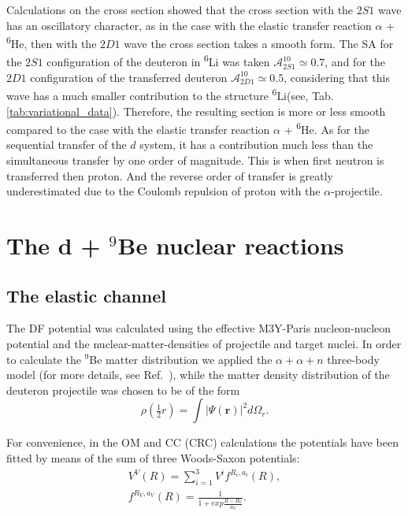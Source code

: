 \documentclass[
12pt, %
oneside, %
english, %
onehalfspacing, %
onehalfspacing, %
headsepline, %
]{MastersDoctoralThesis} %
\newcommand{\he}{\textsuperscript{6}He\xspace}
\newcommand{\li}{\textsuperscript{6}Li\xspace}
\begin{document}
Calculations on the cross section showed that the cross section with the $2S1$ wave has an oscillatory character, as in the case with the elastic transfer reaction $\alpha$ + \he, then with the $2D1$ wave the cross section takes a smooth form. 
The SA for the $2S1$ configuration of the deuteron in \li was taken $ \mathcal {A}^{10} _ {2S1} \simeq 0.7 $, and for the $2D1$ configuration of the transferred deuteron $ \mathcal{A}^ {10}_{2D1} \simeq 0.5 $, considering that this wave has a much smaller contribution to the structure \li (see, Tab. \ref{tab:variational_data}). Therefore, the resulting section is more or less smooth compared to the case with the elastic transfer reaction $\alpha$ + \he.
As for the sequential transfer of the $d$ system, it has a contribution much less than the simultaneous transfer by one order of magnitude. This is when first neutron is transferred then proton. And the reverse order of transfer is greatly underestimated due to the Coulomb repulsion of proton with the $\alpha$-projectile.

\clearpage





\section{The d + $^9$Be nuclear reactions}

\subsection{The elastic channel}
The DF potential was calculated using the effective M3Y-Paris nucleon-nucleon potential and the nuclear-matter-densities of projectile and target nuclei. In order to calculate the ${}^9$Be matter distribution we applied the $\alpha+\alpha+n$ three-body model (for more details, see Ref.~\cite{urazbekov2016}), while the matter density distribution of the deuteron projectile was chosen to be of the form
\begin{equation}
\rho\left( \tfrac{1}{2}r \right) =\int \vert \Psi (\textbf{r}) \vert ^2 d \Omega_r.
\end{equation}

For convenience, in the OM and CC (CRC) calculations the potentials have been fitted by means of the sum of three Woods-Saxon potentials:
\begin{eqnarray}
V^V(R) =  \sum_{i=1}^{3} V^i f^{R_i, a_i}(R), \\
 f^{R_V,a_V}(R)=\frac{1}{1+exp{\frac{R-R_V}{a_V}}}.
\end{eqnarray}
\end{document}
